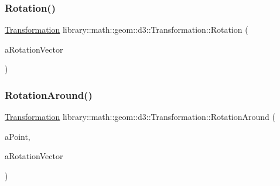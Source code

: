 \subsubsection{\texorpdfstring{Rotation()}{Rotation()}}
{\footnotesize\ttfamily \hyperlink{classlibrary_1_1math_1_1geom_1_1d3_1_1_transformation}{Transformation} library\+::math\+::geom\+::d3\+::\+Transformation\+::\+Rotation (\begin{DoxyParamCaption}\item[{const \hyperlink{classlibrary_1_1math_1_1geom_1_1d3_1_1trf_1_1rot_1_1_rotation_vector}{Rotation\+Vector} \&}]{a\+Rotation\+Vector }\end{DoxyParamCaption})\hspace{0.3cm}{\ttfamily [static]}}

\mbox{\label{classlibrary_1_1math_1_1geom_1_1d3_1_1_transformation_a11d93f665adb24cc4fdf2244c8509082}} 
\subsubsection{\texorpdfstring{Rotation\+Around()}{RotationAround()}}
{\footnotesize\ttfamily \hyperlink{classlibrary_1_1math_1_1geom_1_1d3_1_1_transformation}{Transformation} library\+::math\+::geom\+::d3\+::\+Transformation\+::\+Rotation\+Around (\begin{DoxyParamCaption}\item[{const \hyperlink{classlibrary_1_1math_1_1geom_1_1d3_1_1objects_1_1_point}{Point} \&}]{a\+Point,  }\item[{const \hyperlink{classlibrary_1_1math_1_1geom_1_1d3_1_1trf_1_1rot_1_1_rotation_vector}{Rotation\+Vector} \&}]{a\+Rotation\+Vector }\end{DoxyParamCaption})\hspace{0.3cm}{\ttfamily [static]}}

\mbox{\label{classlibrary_1_1math_1_1geom_1_1d3_1_1_transformation_a9511c7844b5b8af0c8c7ad97454a5a96}} 
